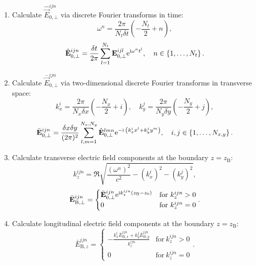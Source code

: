 \begin{enumerate}
	\item Calculate $ \hat{\vec{E}}_{0, \bot}^{ijn} $ via discrete Fourier transforms in time:
	\begin{equation}
	\omega^n = \frac{2 \pi}{N_t \delta t} \left( -\frac{N_t}{2} + n \right),
	\end{equation}
	\begin{equation}
	\hat{\mathbf{E}}_{0, \bot}^{ijn} = \frac{\delta t}{2 \pi} \sum_{l=1}^{N_t} \mathbf{E}_{0, \bot}^{ijl} \mathrm{e}^{\mathrm{i} \omega^n t^l}, \quad n \in \left\lbrace 1, \dots, N_t \right\rbrace.
	\end{equation}
	\item Calculate $ \bar{\vec{E}}_{0, \bot}^{ijn} $ via two-dimensional discrete Fourier transforms in transverse space:
	\begin{equation}
	k_x^i = \frac{2 \pi}{N_x \delta x} \left( - \frac{N_x}{2} + i\right), \quad k_y^j = \frac{2 \pi}{N_y \delta y} \left( - \frac{N_y}{2} + j\right),
	\end{equation}
	\begin{equation}
	\bar{\mathbf{E}}_{0, \bot}^{ijn} = \frac{\delta x \delta y}{(2 \pi)^2} \sum_{l, m = 1}^{N_x, N_y} \hat{\mathbf{E}}_{0, \bot}^{lmn} \mathrm{e}^{- \mathrm{i} \: \left(k_x^i x^l + k_y^j y^m \right)}, \quad i, j \in \left\lbrace 1, \dots, N_{x, y} \right\rbrace.
	\end{equation}
	\item Calculate transverse electric field components at the boundary $ z = z_\mathrm{B} $:
	\begin{equation}
	k_z^{ijn} = \Re \sqrt{\frac{(\omega^n)^2}{c^2} - (k_x^i)^2 - (k_y^j)^2},
	\end{equation}
	\begin{equation}
	\bar{\mathbf{E}}_{\mathrm{B}, \bot}^{ijn} =
	\begin{cases} \bar{\mathbf{E}}_{0, \bot}^{ijn} \mathrm{e}^{\mathrm{i} k_z^{ijn}(z_\mathrm{B} - z_0)} & \text{for} \ k_z^{ijn} > 0 \\ 0 & \text{for} \ k_z^{ijn} = 0 \end{cases}.
	\end{equation}
	\item Calculate longitudinal electric field components at the boundary $ z = z_\mathrm{B} $:
	\begin{equation}
	\bar{E}_{\mathrm{B}, z}^{ijn} = \begin{cases} -\frac{k_x^i \bar{E}_{\mathrm{B}, x}^{ijn} + k_y^j \bar{E}_{\mathrm{B}, y}^{ijn}}{k_z^{ijn}} & \text{for} \ k_z^{ijn} > 0 \\ 0 & \text{for} \ k_z^{ijn} = 0 \end{cases}.

\end{equation}
\end{enumerate}
